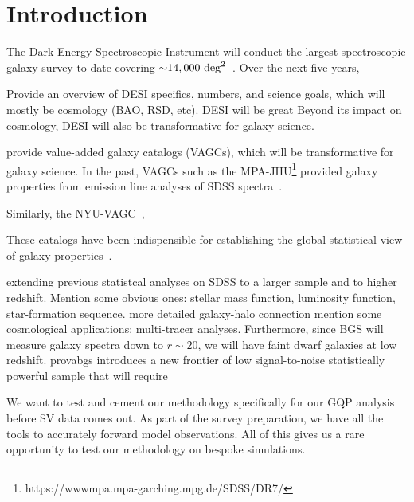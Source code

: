\section{Introduction} \label{sec:intro} 
The Dark Energy Spectroscopic Instrument will conduct the largest spectroscopic
galaxy survey to date covering ${\sim}14,000~{\rm
deg}^2$~\citep{desicollaboration2016}. 
Over the next five years, 

Provide an overview of DESI specifics, numbers, and science goals, which will 
mostly be cosmology (BAO, RSD, etc). DESI will be great
Beyond its impact on cosmology, DESI will also be transformative for galaxy
science. 


provide value-added galaxy
catalogs (VAGCs), which will be transformative for galaxy science. 
In the past, VAGCs such as the
MPA-JHU\footnote{https://wwwmpa.mpa-garching.mpg.de/SDSS/DR7/}
provided galaxy properties from emission line analyses of SDSS
spectra~\cite{brinchmann2004}. 

Similarly, the NYU-VAGC~\citep{blanton2005}, 

These catalogs have been indispensible for establishing the global statistical
view of galaxy properties~\citep[see][for a review]{blanton2009}. 

extending previous statistcal analyses on SDSS to a larger sample and to higher
redshift. 
Mention some obvious ones: stellar mass function, luminosity function,
star-formation sequence.  
more detailed galaxy-halo connection 
mention some cosmological applications: multi-tracer analyses.  
Furthermore, since BGS will measure galaxy spectra down to $r\sim20$, we will
have faint dwarf galaxies at low redshift. 
provabgs introduces a new frontier of low signal-to-noise statistically
powerful sample that will require  


We want to test and cement our methodology specifically for our GQP 
analysis before SV data comes out. 
As part of the survey preparation, we have all the tools to accurately 
forward model observations. 
All of this gives us a rare opportunity to test our methodology on bespoke
simulations. 

